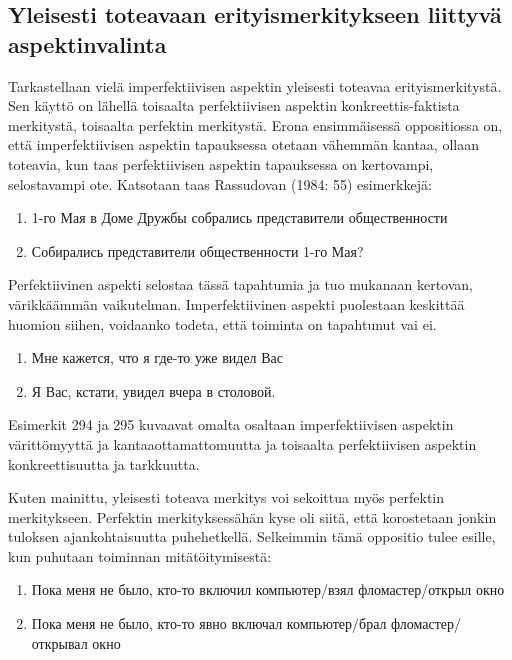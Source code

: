 \documentclass[]{scrreprt}
\providecommand{\tightlist}{%
  \setlength{\itemsep}{0pt}\setlength{\parskip}{0pt}}
\begin{document}
\subsection{Yleisesti toteavaan erityismerkitykseen liittyvä
aspektinvalinta}\label{yleisesti-toteavaan-erityismerkitykseen-liittyvuxe4-aspektinvalinta}

Tarkastellaan vielä imperfektiivisen aspektin yleisesti toteavaa
erityismerkitystä. Sen käyttö on lähellä toisaalta perfektiivisen
aspektin konkreettis-faktista merkitystä, toisaalta perfektin
merkitystä. Erona ensimmäisessä oppositiossa on, että imperfektiivisen
aspektin tapauksessa otetaan vähemmän kantaa, ollaan toteavia, kun taas
perfektiivisen aspektin tapauksessa on kertovampi, selostavampi ote.
Katsotaan taas Rassudovan (1984: 55) esimerkkejä:

\begin{enumerate}
\def\labelenumi{(\arabic{enumi})}
\setcounter{enumi}{291}
\tightlist
\item
  1-го Мая в Доме Дружбы собрались представители общественности
\item
  Собирались представители общественности 1-го Мая?
\end{enumerate}

Perfektiivinen aspekti selostaa tässä tapahtumia ja tuo mukanaan
kertovan, värikkäämmän vaikutelman. Imperfektiivinen aspekti puolestaan
keskittää huomion siihen, voidaanko todeta, että toiminta on tapahtunut
vai ei.

\begin{enumerate}
\def\labelenumi{(\arabic{enumi})}
\setcounter{enumi}{293}
\tightlist
\item
  Мне кажется, что я где-то уже видел Вас
\item
  Я Вас, кстати, увидел вчера в столовой.
\end{enumerate}

Esimerkit 294 ja 295 kuvaavat omalta osaltaan imperfektiivisen aspektin
värittömyyttä ja kantaaottamattomuutta ja toisaalta perfektiivisen
aspektin konkreettisuutta ja tarkkuutta.

Kuten mainittu, yleisesti toteava merkitys voi sekoittua myös perfektin
merkitykseen. Perfektin merkityksessähän kyse oli siitä, että
korostetaan jonkin tuloksen ajankohtaisuutta puhehetkellä. Selkeimmin
tämä oppositio tulee esille, kun puhutaan toiminnan mitätöitymisestä:

\begin{enumerate}
\def\labelenumi{(\arabic{enumi})}
\setcounter{enumi}{295}
\tightlist
\item
  Пока меня не было, кто-то включил компьютер/взял фломастер/открыл окно
\item
  Пока меня не было, кто-то явно включал компьютер/брал
  фломастер/открывал окно
\end{enumerate}
\end{document}
